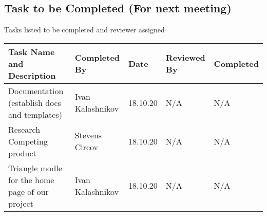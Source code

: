 \documentclass{article}
\begin{document}
\subsection{Task to be Completed (For next meeting) }
Tasks listed to be completed and reviewer assigned
\begin{center}
    \begin{tabular}{|p{9cm}|l|l|l|l|}
    \hline
    Task Name and Description & Completed By & Date & Reviewed By & Completed \\ \hline
    Documentation (establish docs and templates) & Ivan Kalashnikov & 18.10.20 & N/A & N/A\\ \hline
    Research Competing product & Stevens Circov & 18.10.20 & N/A & N/A\\ \hline
    Triangle modle for the home page of our project & Ivan Kalashnikov & 18.10.20 & N/A & N/A\\ \hline
    \end{tabular}
    \end{center}
\end{document}
